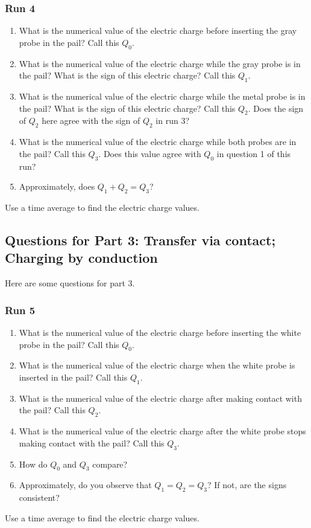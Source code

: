 \subsubsection{Run 4}
%
\begin{enumerate}
	\item What is the numerical value of the electric charge before inserting the gray probe in the pail? Call this $Q_{0}$.
	\item What is the numerical value of the electric charge while the gray probe is in the pail? What is the sign of this electric charge? Call this $Q_{1}$.
	\item What is the numerical value of the electric charge while the metal probe is in the pail? What is the sign of this electric charge? Call this $Q_{2}$. Does the sign of $Q_{2}$ here agree with the sign of $Q_{2}$ in run 3?
	\item What is the numerical value of the electric charge while both probes are in the pail? Call this $Q_{3}$. Does this value agree with $Q_{0}$ in question 1 of this run?
	\item Approximately, does $Q_{1} + Q_{2} = Q_{3}$?
\end{enumerate}
Use a time average to find the electric charge values.
%
\subsection{Questions for Part 3: Transfer via contact; Charging by conduction}
%
Here are some questions for part 3.
%
\subsubsection{Run 5}
%
\begin{enumerate}
	\item What is the numerical value of the electric charge before inserting the white probe in the pail? Call this $Q_{0}$.
	\item What is the numerical value of the electric charge when the white probe is inserted in the pail? Call this $Q_{1}$.
	\item What is the numerical value of the electric charge after making contact with the pail? Call this $Q_{2}$.
	\item What is the numerical value of the electric charge after the white probe stops making contact with the pail? Call this $Q_{3}$.
	\item How do $Q_{0}$ and $Q_{3}$ compare?
	\item Approximately, do you observe that $Q_{1} = Q_{2} = Q_{3}$? If not, are the signs consistent?
\end{enumerate}
Use a time average to find the electric charge values.
%
